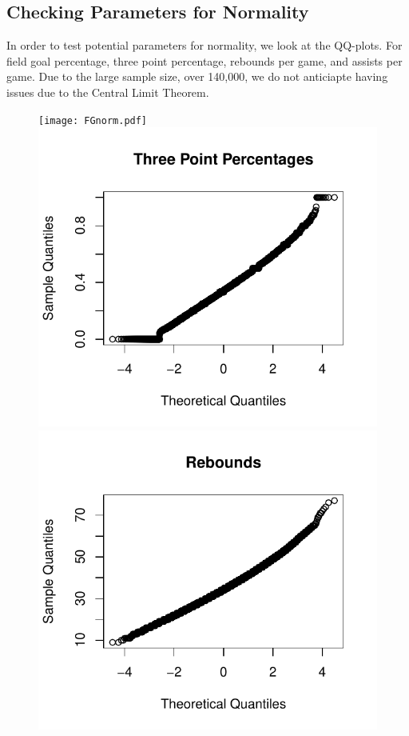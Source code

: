 \documentclass[]{scrartcl}
\begin{document}
\subsection*{Checking Parameters for Normality}
In order to test potential parameters for normality, we look at the QQ-plots. For field goal percentage, three point percentage, rebounds per game, and assists per game. Due to the large sample size, over 140,000, we do not anticiapte having issues due to the Central Limit Theorem.  
\begin{figure}[H]
	\centering
	\texttt{[image: FGnorm.pdf]}
	\includegraphics[scale=.6]{3pnorm.pdf}
	\includegraphics[scale=.6]{rbnorm.pdf}

\end{figure}
\end{document}
